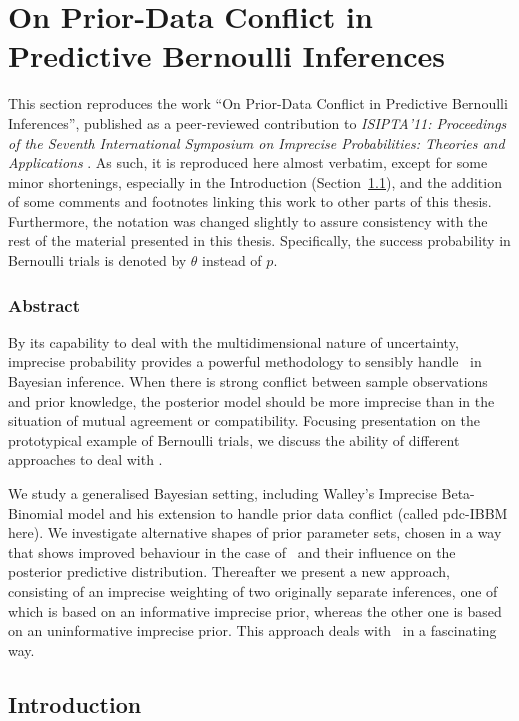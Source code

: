 \section{On Prior-Data Conflict in Predictive Bernoulli Inferences}
\label{sec:isipta11}

This section reproduces the work
``On Prior-Data Conflict in Predictive Bernoulli Inferences'',
published as a peer-reviewed contribution to
\emph{ISIPTA'11: Proceedings of the Seventh International Symposium on
Imprecise Probabilities: Theories and Applications} \parencite{Walter2011a}.
As such, it is reproduced here almost verbatim,
except for some minor shortenings, especially in the Introduction (Section~\ref{sec:isipta11-intro}),
and the addition of some comments and footnotes linking this work to other parts of this thesis.
Furthermore, the notation was changed slightly to assure consistency with the rest of the material presented in this thesis.
Specifically, the success probability in Bernoulli trials is denoted by $\theta$ instead of $p$.

\subsubsection*{Abstract}

By its capability to deal with the multidimensional nature of
uncertainty, imprecise probability provides a powerful methodology
to sensibly handle \pdc\ in Bayesian inference. When there is
strong conflict between sample observations and prior knowledge, the posterior model should be more imprecise
than in the situation of mutual agreement or compatibility. Focusing
presentation on the prototypical example of Bernoulli
trials, we discuss the ability of different approaches to deal with \pdc.

We study a generalised Bayesian setting, including Walley's Imprecise Beta-Binomial model
and his extension to handle prior data conflict (called pdc-IBBM here).
We investigate alternative shapes of prior parameter sets, chosen in a way that shows improved
behaviour in the case of \pdc\ and their influence on the posterior predictive distribution.
Thereafter we present a new approach, consisting of an
imprecise weighting of two originally separate inferences, one of which is based on an informative
imprecise prior, whereas the other one is based on an uninformative imprecise prior. This approach
deals with \pdc\ in a fascinating way.

\subsection{Introduction}
\label{sec:isipta11-intro}

